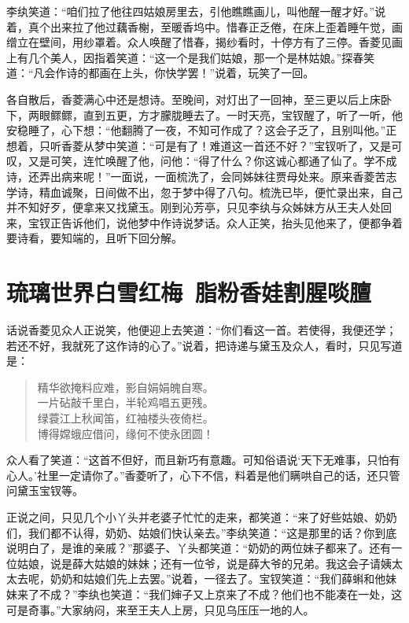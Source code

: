 \documentclass[12pt,oneside]{book}
\newenvironment{shici}{%
\begin{verse}%
\centering\large\hspace{12pt}}%
{\end{verse}}
\begin{document}
李纨笑道：“咱们拉了他往四姑娘房里去，引他瞧瞧画儿，叫他醒一醒才好。”说着，真个出来拉了他过藕香榭，至暖香坞中。惜春正乏倦，在床上歪着睡午觉，画缯立在壁间，用纱罩着。众人唤醒了惜春，揭纱看时，十停方有了三停。香菱见画上有几个美人，因指着笑道：“这一个是我们姑娘，那一个是林姑娘。”探春笑道：“凡会作诗的都画在上头，你快学罢！”说着，玩笑了一回。

各自散后，香菱满心中还是想诗。至晚间，对灯出了一回神，至三更以后上床卧下，两眼鳏鳏，直到五更，方才朦胧睡去了。一时天亮，宝钗醒了，听了一听，他安稳睡了，心下想：“他翻腾了一夜，不知可作成了？这会子乏了，且别叫他。”正想着，只听香菱从梦中笑道：“可是有了！难道这一首还不好？”宝钗听了，又是可叹，又是可笑，连忙唤醒了他，问他：“得了什么？你这诚心都通了仙了。学不成诗，还弄出病来呢！”一面说，一面梳洗了，会同姊妹往贾母处来。原来香菱苦志学诗，精血诚聚，日间做不出，忽于梦中得了八句。梳洗已毕，便忙录出来，自己并不知好歹，便拿来又找黛玉。刚到沁芳亭，只见李纨与众姊妹方从王夫人处回来，宝钗正告诉他们，说他梦中作诗说梦话。众人正笑，抬头见他来了，便都争着要诗看，要知端的，且听下回分解。
 




\chapter{琉璃世界白雪红梅~脂粉香娃割腥啖膻}
话说香菱见众人正说笑，他便迎上去笑道：“你们看这一首。若使得，我便还学；若还不好，我就死了这作诗的心了。”说着，把诗递与黛玉及众人，看时，只见写道是：

\begin{shici}
精华欲掩料应难，影自娟娟魄自寒。\\
一片砧敲千里白，半轮鸡唱五更残。\\
绿蓑江上秋闻笛，红袖楼头夜倚栏。\\
博得嫦蛾应借问，缘何不使永团圆！
\end{shici}


众人看了笑道：“这首不但好，而且新巧有意趣。可知俗语说‘天下无难事，只怕有心人。’社里一定请你了。”香菱听了，心下不信，料着是他们瞒哄自己的话，还只管问黛玉宝钗等。

正说之间，只见几个小丫头并老婆子忙忙的走来，都笑道：“来了好些姑娘、奶奶们，我们都不认得，奶奶、姑娘们快认亲去。”李纨笑道：“这是那里的话？你到底说明白了，是谁的亲戚？”那婆子、丫头都笑道：“奶奶的两位妹子都来了。还有一位姑娘，说是薛大姑娘的妹妹；还有一位爷，说是薛大爷的兄弟。我这会子请姨太太去呢，奶奶和姑娘们先上去罢。”说着，一径去了。宝钗笑道：“我们薛蝌和他妹妹来了不成？”李纨也笑道：“我们婶子又上京来了不成？他们也不能凑在一处，这可是奇事。”大家纳闷，来至王夫人上房，只见乌压压一地的人。
\end{document}
